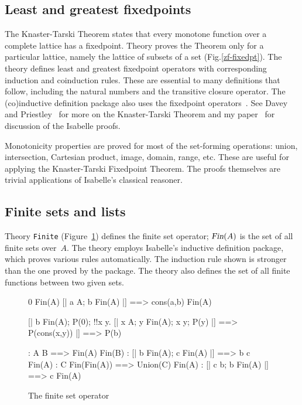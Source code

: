 \subsection{Least and greatest fixedpoints}

The Knaster-Tarski Theorem states that every monotone function over a
complete lattice has a fixedpoint.  Theory  proves the
Theorem only for a particular lattice, namely the lattice of subsets of a
set (Fig.\ts\ref{zf-fixedpt}).  The theory defines least and greatest
fixedpoint operators with corresponding induction and coinduction rules.
These are essential to many definitions that follow, including the natural
numbers and the transitive closure operator.  The (co)inductive definition
package also uses the fixedpoint operators~\cite{paulson-CADE}.  See
Davey and Priestley~\cite{davey-priestley} for more on the Knaster-Tarski
Theorem and my paper~\cite{paulson-set-II} for discussion of the Isabelle
proofs.

Monotonicity properties are proved for most of the set-forming operations:
union, intersection, Cartesian product, image, domain, range, etc.  These
are useful for applying the Knaster-Tarski Fixedpoint Theorem.  The proofs
themselves are trivial applications of Isabelle's classical reasoner. 


\subsection{Finite sets and lists}

Theory \texttt{Finite} (Figure~\ref{zf-fin}) defines the finite set operator;
$\emph{\sl Fin}(A)$ is the set of all finite sets over~$A$.  The theory employs
Isabelle's inductive definition package, which proves various rules
automatically.  The induction rule shown is stronger than the one proved by
the package.  The theory also defines the set of all finite functions
between two given sets.

\begin{figure}
\begin{alltt*}\isastyleminor
{}      0 \isasymin Fin(A)
       [| a \isasymin A;  b \isasymin Fin(A) |] ==> cons(a,b) \isasymin Fin(A)

    [| b \isasymin Fin(A);
       P(0);
       !!x y. [| x \isasymin A;  y \isasymin Fin(A);  x \isasymnotin y;  P(y) |] ==> P(cons(x,y))
    |] ==> P(b)

:       A \isasymsubseteq B ==> Fin(A) \isasymsubseteq Fin(B)
:        [| b \isasymin Fin(A);  c \isasymin Fin(A) |] ==> b \isasymunion c \isasymin Fin(A)
:     C \isasymin Fin(Fin(A)) ==> Union(C) \isasymin Fin(A)
:     [| c \isasymsubseteq b;  b \isasymin Fin(A) |] ==> c \isasymin Fin(A)
\end{alltt*}
\caption{The finite set operator} \label{zf-fin}
\end{figure}

